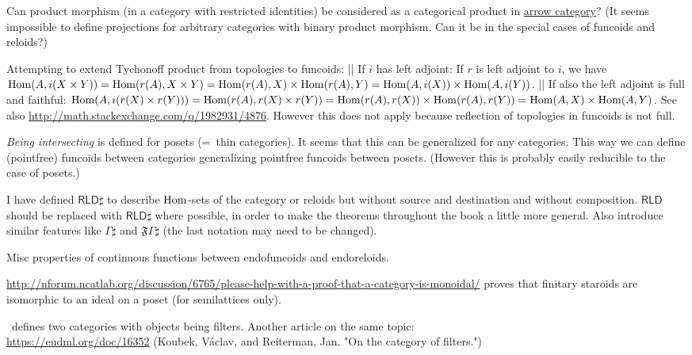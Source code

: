 \documentclass{amsart}
\begin{document}
Can product morphism (in a category with restricted
identities) be considered as a categorical product
in \href{https://en.wikipedia.org/wiki/Comma_category#Arrow_category}{arrow category}?
(It seems impossible to define projections for
arbitrary categories with binary product morphism.
Can it be in the special cases of funcoids and reloids?)

Attempting to extend Tychonoff product from topologies to funcoids:
|| If $i$ has left adjoint:
If $r$ is left adjoint to $i$, we have $\operatorname{Hom}(A, i(X\times Y)) = \operatorname{Hom}(r(A), X\times Y) = \operatorname{Hom}(r(A), X)\times \operatorname{Hom}(r(A), Y) = \operatorname{Hom}(A, i(X))\times \operatorname{Hom}(A, i(Y))$.
|| If also the left adjoint is full and faithful:
$\operatorname{Hom}(A, i(r(X)\times r(Y))) = \operatorname{Hom}(r(A), r(X)\times r(Y)) = \operatorname{Hom}(r(A), r(X))\times \operatorname{Hom}(r(A), r(Y)) = \operatorname{Hom}(A, X)\times \operatorname{Hom}(A, Y)$.
See also \url{http://math.stackexchange.com/q/1982931/4876}. However this does not apply because reflection of topologies in funcoids
is not full.

\emph{Being intersecting} is defined for posets (=~thin categories). It seems that this can be generalized for any categories.
This way we can define (pointfree) funcoids between categories generalizing pointfree funcoids between posets.
(However this is probably easily reducible to the case of posets.)

I have defined $\mathsf{RLD}\sharp$ to describe $\operatorname{Hom}$-sets of the category or reloids but without source and destination and without composition.
$\mathsf{RLD}$ should be replaced with $\mathsf{RLD}\sharp$ where possible, in order to make the theorems throughout the book a little more general.
Also introduce similar features like $\Gamma\sharp$ and $\mathfrak{F}\Gamma\sharp$ (the last notation may need to be changed).

Misc properties of continuous functions between endofuncoids and endoreloids.

\url{http://nforum.ncatlab.org/discussion/6765/please-help-with-a-proof-that-a-category-is-monoidal/} proves that
finitary staroids are isomorphic to an ideal on a poset (for semilattices only).

\cite{filt-cat}~defines two categories with objects being filters. Another article on the same topic:\\
\url{https://eudml.org/doc/16352} (Koubek, V\'aclav, and Reiterman, Jan. "On the category of filters.")

\end{document}
